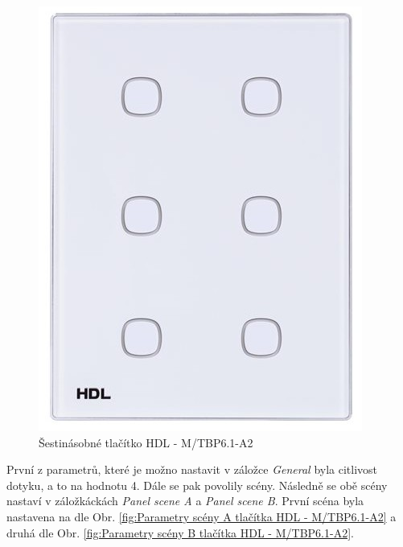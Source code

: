 \begin{figure}[!ht]
  \begin{center}
    \includegraphics[scale=0.25]{obrazky/HDL.jpg}
  \end{center}
  \caption[Šestinásobné tlačítko HDL - M/TBP6.1-A2 \cite{HDL}]{Šestinásobné tlačítko HDL - M/TBP6.1-A2 \cite{HDL}}
  \label{fig:Šestinásobné tlačítko HDL - M/TBP6.1-A2}
\end{figure}

\newpage První z parametrů, které je možno nastavit v záložce \textit{General} byla citlivost dotyku, a to na hodnotu 4. Dále se pak povolily scény. Následně se obě scény nastaví v záložkáckách \textit{Panel scene A} a \textit{Panel scene B}. První scéna byla nastavena na dle Obr. \ref{fig:Parametry scény A tlačítka HDL - M/TBP6.1-A2} a druhá dle Obr. \ref{fig:Parametry scény B tlačítka HDL - M/TBP6.1-A2}.

